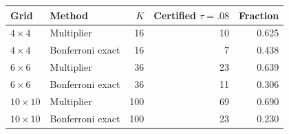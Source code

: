 \begin{tabular}{llrrr}
\toprule
Grid & Method & $K$ & Certified $\tau=.08$ & Fraction \\
\midrule
$4\times4$ & Multiplier & 16 & 10 & 0.625 \\
$4\times4$ & Bonferroni exact & 16 & 7 & 0.438 \\
$6\times6$ & Multiplier & 36 & 23 & 0.639 \\
$6\times6$ & Bonferroni exact & 36 & 11 & 0.306 \\
$10\times10$ & Multiplier & 100 & 69 & 0.690 \\
$10\times10$ & Bonferroni exact & 100 & 23 & 0.230 \\
\bottomrule
\end{tabular}
